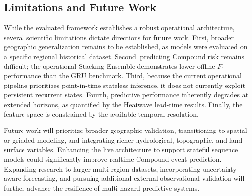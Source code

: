 \subsection{Limitations and Future Work}
While the evaluated framework establishes a robust operational architecture, several scientific limitations dictate directions for future work. First, broader geographic generalization remains to be established, as models were evaluated on a specific regional historical dataset. Second, predicting Compound risk remains difficult; the operational Stacking Ensemble demonstrates lower offline $F_1$ performance than the GRU benchmark. Third, because the current operational pipeline prioritizes point-in-time stateless inference, it does not currently exploit persistent recurrent states. Fourth, predictive performance inherently degrades at extended horizons, as quantified by the Heatwave lead-time results. Finally, the feature space is constrained by the available temporal resolution.

Future work will prioritize broader geographic validation, transitioning to spatial or gridded modeling, and integrating richer hydrological, topographic, and land-surface variables. Enhancing the live architecture to support stateful sequence models could significantly improve realtime Compound-event prediction. Expanding research to larger multi-region datasets, incorporating uncertainty-aware forecasting, and pursuing additional external observational validation will further advance the resilience of multi-hazard predictive systems.
